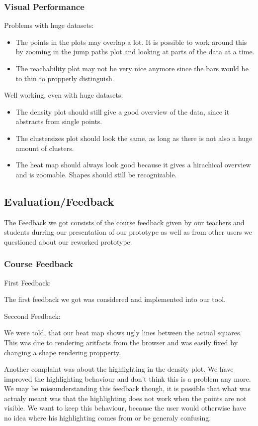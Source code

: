 \documentclass{vgtc}                          %
\begin{document}
\subsubsection{Visual Performance}
 Problems with huge datasets:
\begin{itemize}
\item The points in the plots may overlap a lot. It is possible to work around this by zooming in the jump paths plot and looking at parts of the data at a time.
\item The reachability plot may not be very nice anymore since the bars would be to thin to propperly distinguish.
\end{itemize}
Well working, even with huge datasets:
\begin{itemize}
\item The density plot should still give a good overview of the data, since it abstracts from single points.
\item The clustersizes plot should look the same, as long as there is not also a huge amount of clusters.
\item The heat map should always look good because it gives a hirachical overview and is zoomable. Shapes should still be recognizable.
\end{itemize}
\subsection{Evaluation/Feedback}
The Feedback we got consists of the course feedback given by our teachers and students durring our presentation of our prototype as well as from other users we questioned about our reworked prototype.
\subsubsection{Course Feedback}

First Feedback:

The first feedback we got was considered and implemented into our tool.

\noindent Seccond Feedback:

We were told, that our heat map shows ugly lines between the actual squares. This was due to rendering aritfacts from the browser and was easily fixed by changing a shape rendering propperty.

Another complaint was about the highlighting in the density plot. We have improved the highlighting behaviour and don't think this is a problem any more. We may be missunderstanding this feedback though, it is possible that what was actualy meant was that the highlighting does not work when the points are not visible. We want to keep this behaviour, because the user would otherwise have no idea where his highlighting comes from or be generaly confusing.
\end{document}
